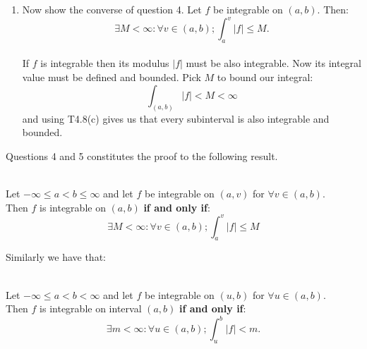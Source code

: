 \begin{enumerate}
    \newpage

    \item Now show the converse of question 4.
    Let $f$ be integrable on $(a,b)$. Then:
    $$\exists M<\infty:\forall v\in(a,b);
    \int_{a}^{v}|f|\leq M.$$ \\

    If $f$ is integrable
    then its modulus $|f|$ must be also integrable.
    Now its integral value must be defined and bounded.
    Pick $M$ to bound our integral:
    $$\int_{(a,b)}|f|<M<\infty$$
    and using T4.8(c) gives us that every subinterval is also
    integrable and bounded. \\
\end{enumerate}

Questions 4 and 5 constitutes the proof to the following result.
\begin{theorem}
    \hfill \\
    Let $-\infty\leq a<b\leq\infty$ and let
    $f$ be integrable on $(a,v)$ for $\forall v\in(a,b)$. \\
    Then $f$ is integrable on $(a,b)$ \textbf{if and only if}:
    $$\exists M<\infty:\forall v\in(a,b);
    \int_{a}^{v}|f|\leq M$$
\end{theorem}

Similarly we have that:
\begin{theorem}
    \hfill \\
    Let $-\infty\leq a<b<\infty$ and let
    $f$ be integrable on $(u,b)$ for $\forall u\in(a,b)$. \\
    Then $f$ is integrable on interval $(a,b)$ \textbf{if and only if}:
    $$\exists m<\infty:\forall u\in(a,b);\int_{u}^{b}|f|<m.$$
\end{theorem}

\newpage


